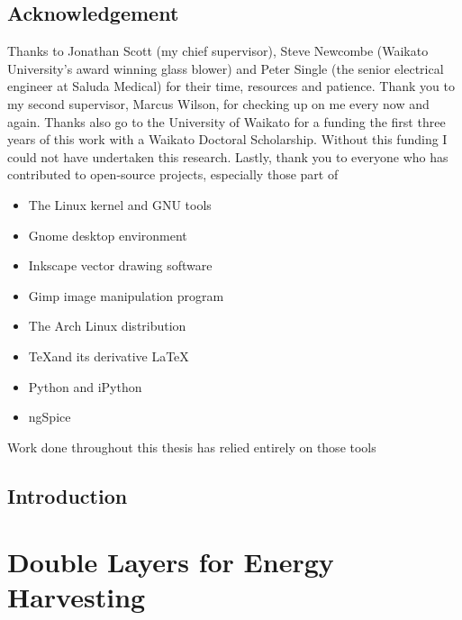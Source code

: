 
\chapter*{Acknowledgement}
Thanks to Jonathan Scott (my chief supervisor), Steve Newcombe (Waikato University's award winning glass blower) and Peter Single (the senior electrical engineer at Saluda Medical) for their time, resources and patience.
Thank you to my second supervisor, Marcus Wilson, for checking up on me every now and again.
Thanks also go to the University of Waikato for a funding the first three years of this work with a Waikato Doctoral Scholarship.
Without this funding I could not have undertaken this research.
Lastly, thank you to everyone who has contributed to open-source projects, especially those part of
\begin{itemize}
\item The Linux kernel and GNU tools
\item Gnome desktop environment
\item Inkscape vector drawing software
\item Gimp image manipulation program
\item The Arch Linux distribution
\item \TeX \space and its derivative \LaTeX
\item Python and iPython
\item ngSpice
\end{itemize}
Work done throughout this thesis has relied entirely on those tools

\tableofcontents{}
\listoffigures
\listoftables
\doublespacing



\chapter{Introduction}
  \label{chap:introduction_main}
  

\part{Double Layers for Energy Harvesting}
  \label{part:doubleLayersOnInsulators}
  


